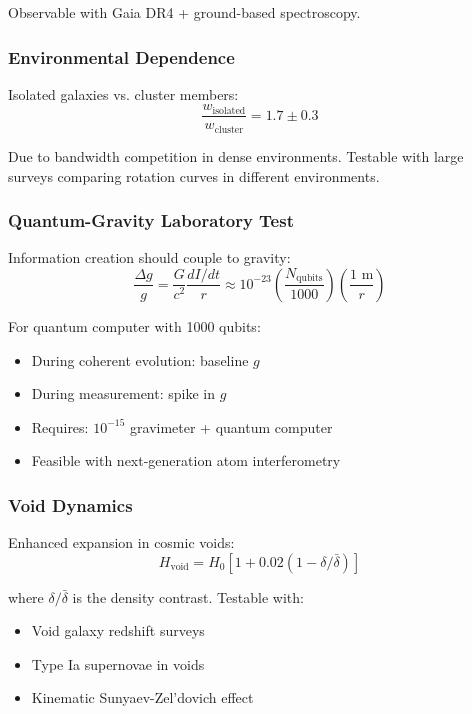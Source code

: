 \documentclass[12pt,letterpaper]{article}
\begin{document}
Observable with Gaia DR4 + ground-based spectroscopy.

\subsubsection{Environmental Dependence}

Isolated galaxies vs. cluster members:
\begin{equation}
\frac{w_{\text{isolated}}}{w_{\text{cluster}}} = 1.7 \pm 0.3
\end{equation}

Due to bandwidth competition in dense environments. Testable with large surveys comparing rotation curves in different environments.

\subsubsection{Quantum-Gravity Laboratory Test}

Information creation should couple to gravity:
\begin{equation}
\frac{\Delta g}{g} = \frac{G}{c^2} \frac{dI/dt}{r} \approx 10^{-23} \left(\frac{N_{\text{qubits}}}{1000}\right)\left(\frac{1\text{ m}}{r}\right)
\end{equation}

For quantum computer with 1000 qubits:
\begin{itemize}
    \item During coherent evolution: baseline $g$
    \item During measurement: spike in $g$
    \item Requires: $10^{-15}$ gravimeter + quantum computer
    \item Feasible with next-generation atom interferometry
\end{itemize}

\subsubsection{Void Dynamics}

Enhanced expansion in cosmic voids:
\begin{equation}
H_{\text{void}} = H_0[1 + 0.02(1-\delta/\bar{\delta})]
\end{equation}

where $\delta/\bar{\delta}$ is the density contrast. Testable with:
\begin{itemize}
    \item Void galaxy redshift surveys
    \item Type Ia supernovae in voids
    \item Kinematic Sunyaev-Zel'dovich effect
\end{itemize}
\end{document}
